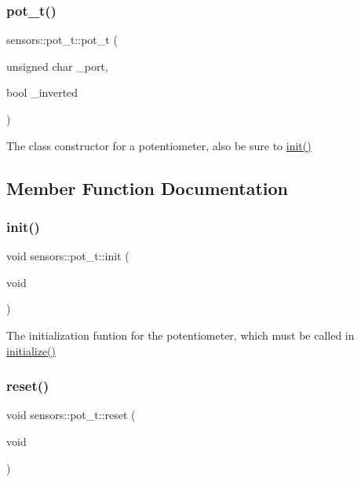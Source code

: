 \subsubsection{\texorpdfstring{pot\+\_\+t()}{pot\_t()}}
{\footnotesize\ttfamily sensors\+::pot\+\_\+t\+::pot\+\_\+t (\begin{DoxyParamCaption}\item[{unsigned char}]{\+\_\+port,  }\item[{bool}]{\+\_\+inverted }\end{DoxyParamCaption})}

The class constructor for a potentiometer, also be sure to \hyperlink{structsensors_1_1pot__t_ab44d6b91085fd38241c4c83b8f1cade1}{init()} 

\subsection{Member Function Documentation}
\mbox{\label{structsensors_1_1pot__t_ab44d6b91085fd38241c4c83b8f1cade1}} 
\subsubsection{\texorpdfstring{init()}{init()}}
{\footnotesize\ttfamily void sensors\+::pot\+\_\+t\+::init (\begin{DoxyParamCaption}\item[{void}]{ }\end{DoxyParamCaption})}

The initialization funtion for the potentiometer, which must be called in \hyperlink{main_8h_a25a40b6614565f755233080a384c35f1}{initialize()} \mbox{\label{structsensors_1_1pot__t_a79492a67771f5cf54b4efcc6ca0178b5}} 
\subsubsection{\texorpdfstring{reset()}{reset()}}
{\footnotesize\ttfamily void sensors\+::pot\+\_\+t\+::reset (\begin{DoxyParamCaption}\item[{void}]{ }\end{DoxyParamCaption})}

